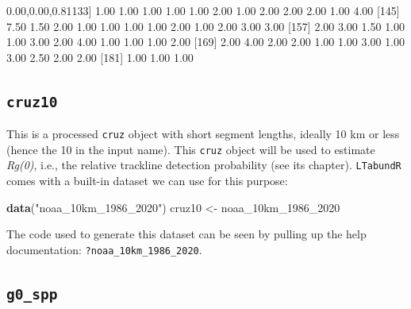 \documentclass[
]{book}
\newenvironment{Shaded}{\begin{snugshade}}{\end{snugshade}}
\newcommand{\DecValTok}[1]{\textcolor[rgb]{0.00,0.00,0.81}{#1}}
\newcommand{\FloatTok}[1]{\textcolor[rgb]{0.00,0.00,0.81}{#1}}
\newcommand{\FunctionTok}[1]{\textcolor[rgb]{0.13,0.29,0.53}{\textbf{#1}}}
\newcommand{\NormalTok}[1]{#1}
\newcommand{\OtherTok}[1]{\textcolor[rgb]{0.56,0.35,0.01}{#1}}
\newcommand{\StringTok}[1]{\textcolor[rgb]{0.31,0.60,0.02}{#1}}
\begin{document}
\begin{Shaded}
\begin{Highlighting}[]
\NormalTok{[}\DecValTok{133}\NormalTok{]  }\FloatTok{1.00}  \FloatTok{1.00}  \FloatTok{1.00}  \FloatTok{1.00}  \FloatTok{1.00}  \FloatTok{2.00}  \FloatTok{1.00}  \FloatTok{2.00}  \FloatTok{2.00}  \FloatTok{2.00}  \FloatTok{1.00}  \FloatTok{4.00}
\NormalTok{[}\DecValTok{145}\NormalTok{]  }\FloatTok{7.50}  \FloatTok{1.50}  \FloatTok{2.00}  \FloatTok{1.00}  \FloatTok{1.00}  \FloatTok{1.00}  \FloatTok{1.00}  \FloatTok{2.00}  \FloatTok{1.00}  \FloatTok{2.00}  \FloatTok{3.00}  \FloatTok{3.00}
\NormalTok{[}\DecValTok{157}\NormalTok{]  }\FloatTok{2.00}  \FloatTok{3.00}  \FloatTok{1.50}  \FloatTok{1.00}  \FloatTok{1.00}  \FloatTok{3.00}  \FloatTok{2.00}  \FloatTok{4.00}  \FloatTok{1.00}  \FloatTok{1.00}  \FloatTok{1.00}  \FloatTok{2.00}
\NormalTok{[}\DecValTok{169}\NormalTok{]  }\FloatTok{2.00}  \FloatTok{4.00}  \FloatTok{2.00}  \FloatTok{2.00}  \FloatTok{1.00}  \FloatTok{1.00}  \FloatTok{3.00}  \FloatTok{1.00}  \FloatTok{3.00}  \FloatTok{2.50}  \FloatTok{2.00}  \FloatTok{2.00}
\NormalTok{[}\DecValTok{181}\NormalTok{]  }\FloatTok{1.00}  \FloatTok{1.00}  \FloatTok{1.00}
\end{Highlighting}
\end{Shaded}

\hypertarget{cruz10}{%
\subsection*{\texorpdfstring{\texttt{cruz10}}{cruz10}}\label{cruz10}}

This is a processed \texttt{cruz} object with short segment lengths, ideally 10 km or less (hence the 10 in the input name). This \texttt{cruz} object will be used to estimate \emph{Rg(0)}, i.e., the relative trackline detection probability (see its chapter). \texttt{LTabundR} comes with a built-in dataset we can use for this purpose:

\begin{Shaded}
\begin{Highlighting}[]
\FunctionTok{data}\NormalTok{(}\StringTok{"noaa\_10km\_1986\_2020"}\NormalTok{)}
\NormalTok{cruz10 }\OtherTok{\textless{}{-}}\NormalTok{ noaa\_10km\_1986\_2020}
\end{Highlighting}
\end{Shaded}

The code used to generate this dataset can be seen by pulling up the help documentation: \texttt{?noaa\_10km\_1986\_2020}.

\hypertarget{g0_spp}{%
\subsection*{\texorpdfstring{\texttt{g0\_spp}}{g0\_spp}}\label{g0_spp}}
\end{document}
